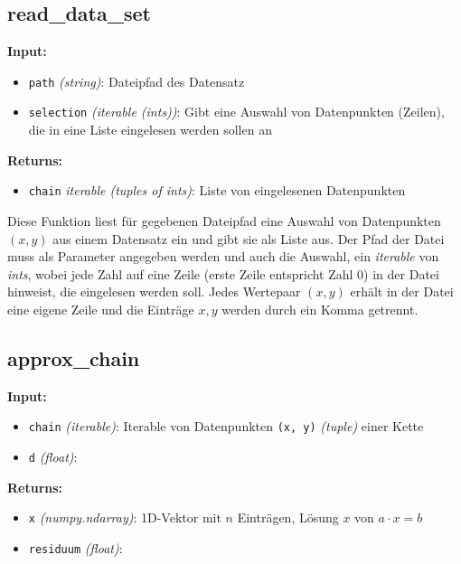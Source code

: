 \documentclass[a4paper, 11pt]{scrartcl}
\begin{document}
\subsection{read\_data\_set}

\textbf{Input:}
\begin{itemize}
    \item \texttt{path} \textit{(string)}:
    Dateipfad des Datensatz
    \item \texttt{selection} \textit{(iterable (ints))}:
    Gibt eine Auswahl von Datenpunkten (Zeilen), die in eine Liste eingelesen werden sollen an
\end{itemize}

\noindent \textbf{Returns:}
\begin{itemize}
    \item \texttt{chain} \textit{iterable (tuples of ints)}:
    Liste von eingelesenen Datenpunkten
\end{itemize}

\noindent Diese Funktion liest für gegebenen Dateipfad eine Auswahl von Datenpunkten $(x,y)$ aus einem Datensatz ein und gibt sie als Liste aus. Der Pfad der Datei muss als Parameter angegeben werden und auch die Auswahl, ein \textit{iterable} von \textit{ints}, wobei jede Zahl auf eine Zeile (erste Zeile entspricht Zahl 0) in der Datei hinweist, die eingelesen werden soll. Jedes Wertepaar $(x,y)$ erhält in der Datei eine eigene Zeile und die Einträge $x, y$ werden durch ein Komma getrennt.



\subsection{approx\_chain}

\textbf{Input:}
\begin{itemize}
    \item \texttt{chain} \textit{(iterable)}:
    Iterable von Datenpunkten \texttt{(x, y)} \textit{(tuple)} einer Kette
    \item \texttt{d} \textit{(float)}:
\end{itemize}

\noindent \textbf{Returns:}
\begin{itemize}
    \item \texttt{x} \textit{(numpy.ndarray)}:
    1D-Vektor mit $n$ Einträgen, Lösung $x$ von $a \cdot x = b$
    \item \texttt{residuum} \textit{(float)}:
\end{itemize}
\end{document}

